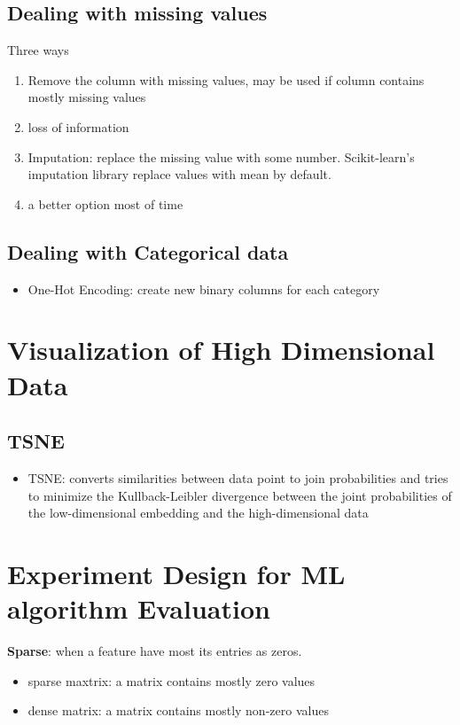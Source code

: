 \documentclass[11pt]{article}
\begin{document}
\subsection{Dealing with missing values}
\label{sec:org1884b36}
Three ways 
\begin{enumerate}
\item Remove the column with missing values, may be used if column contains mostly missing values
\item loss of information
\item Imputation: replace the missing value with some number. Scikit-learn's imputation library replace values with mean by default.
\item a better option most of time
\end{enumerate}
\subsection{Dealing with Categorical data}
\label{sec:org9fae788}
\begin{itemize}
\item One-Hot Encoding: create new binary columns for each category
\end{itemize}

\section{Visualization of High Dimensional Data}
\label{sec:org2fb089f}
\subsection{TSNE}
\label{sec:orgd3d2549}
\begin{itemize}
\item TSNE: converts similarities between data point to join probabilities and tries to minimize the Kullback-Leibler divergence between the joint probabilities of the low-dimensional embedding and the high-dimensional data
\end{itemize}

\section{Experiment Design for ML algorithm Evaluation}
\label{sec:orgc965709}
\textbf{\textbf{Sparse}}: when a feature have most its entries as zeros.
\begin{itemize}
\item sparse maxtrix: a matrix contains mostly zero values
\item dense matrix: a matrix contains mostly non-zero values
\end{itemize}
\end{document}
